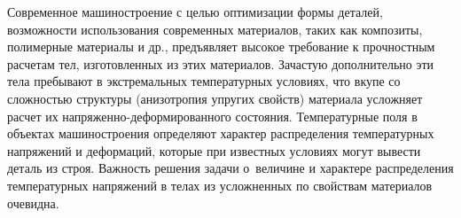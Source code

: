 \documentclass[press]{vestnik}
\begin{document}

\date{13-05-2024}

\maketitle

Современное машиностроение с целью оптимизации формы деталей, возможности 
использования современных материалов, таких как композиты, полимерные 
материалы и др., предъявляет высокое требование к прочностным расчетам тел, 
изготовленных из этих материалов. Зачастую дополнительно эти тела пребывают 
в экстремальных температурных условиях, что вкупе со сложностью структуры 
(анизотропия упругих свойств) материала усложняет расчет их 
напряженно-деформированного состояния. Температурные поля в объектах 
машиностроения определяют характер распределения температурных напряжений и 
деформаций, которые при известных условиях могут вывести деталь из строя. 
Важность решения задачи о~величине и характере распределения температурных 
напряжений в телах из усложненных по свойствам материалов очевидна.
\end{document}
